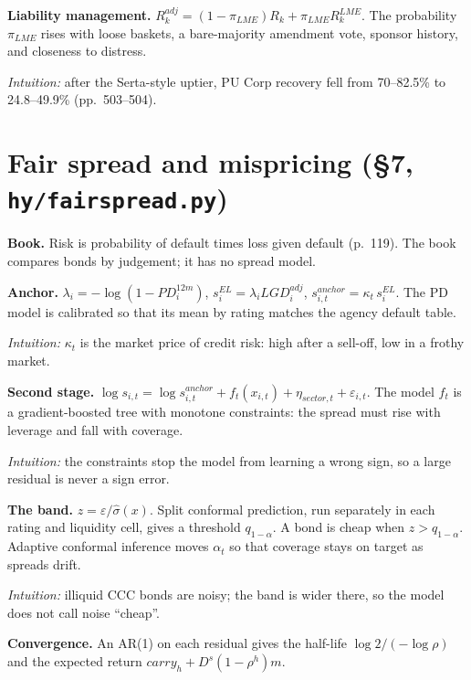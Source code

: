 \documentclass[11pt,a4paper]{article}
\newcommand{\code}[1]{\texttt{\small #1}}
\newcommand{\why}[1]{\par\noindent\textcolor{teal!60!black}{\textit{Intuition:} #1}\par}
\begin{document}
\textbf{Liability management.} $R^{adj}_k=(1-\pi_{LME})R_k+\pi_{LME}R^{LME}_k$. The probability $\pi_{LME}$ rises with loose baskets, a bare-majority amendment vote, sponsor history, and closeness to distress.
\why{after the Serta-style uptier, PU Corp recovery fell from 70--82.5\% to 24.8--49.9\% (pp.~503--504).}

\section{Fair spread and mispricing (\S7, \code{hy/fairspread.py})}
\label{sec:fair}
\textbf{Book.} Risk is probability of default times loss given default (p.~119). The book compares bonds by judgement; it has no spread model.

\textbf{Anchor.} $\lambda_i=-\log(1-PD^{12m}_i)$, $s^{EL}_i=\lambda_iLGD^{adj}_i$, $s^{anchor}_{i,t}=\kappa_t\,s^{EL}_i$. The PD model is calibrated so that its mean by rating matches the agency default table.
\why{$\kappa_t$ is the market price of credit risk: high after a sell-off, low in a frothy market.}

\textbf{Second stage.} $\log s_{i,t}=\log s^{anchor}_{i,t}+f_t(x_{i,t})+\eta_{sector,t}+\varepsilon_{i,t}$. The model $f_t$ is a gradient-boosted tree with monotone constraints: the spread must rise with leverage and fall with coverage.
\why{the constraints stop the model from learning a wrong sign, so a large residual is never a sign error.}

\textbf{The band.} $z=\varepsilon/\hat\sigma(x)$. Split conformal prediction, run separately in each rating and liquidity cell, gives a threshold $q_{1-\alpha}$. A bond is cheap when $z>q_{1-\alpha}$. Adaptive conformal inference moves $\alpha_t$ so that coverage stays on target as spreads drift.
\why{illiquid CCC bonds are noisy; the band is wider there, so the model does not call noise ``cheap''.}

\textbf{Convergence.} An AR(1) on each residual gives the half-life $\log2/(-\log\rho)$ and the expected return $carry_h+D^s(1-\rho^h)m$.
\end{document}
